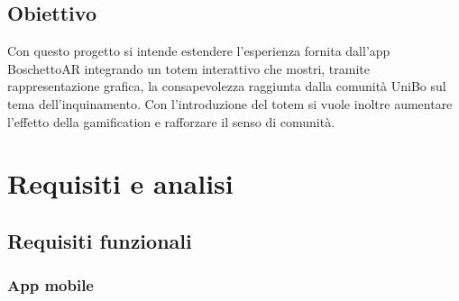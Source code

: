 \subsection{Obiettivo}
Con questo progetto si intende estendere l'esperienza fornita dall'app BoschettoAR integrando un totem interattivo che mostri, tramite rappresentazione grafica, la consapevolezza raggiunta dalla comunità UniBo sul tema dell'inquinamento. Con l'introduzione del totem si vuole inoltre aumentare l'effetto della gamification e rafforzare il senso di comunità.

\section{Requisiti e analisi}
\subsection{Requisiti funzionali}
\subsubsection{App mobile}
